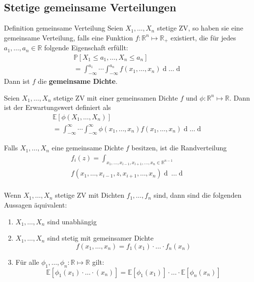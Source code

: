 \documentclass[a4paper,10pt]{article}
\def\R{\mathbb{R}}
\def\P{\mathbb{P}}
\def\E{\mathbb{E}}
\begin{document}
\subsection{Stetige gemeinsame Verteilungen}
\begin{subbox}{Definition gemeinsame Verteilung}
	Seien \(X_1, \ldots, X_n\) stetige ZV, so haben sie eine gemeinsame Verteilung, falls eine Funktion \(f: \R^n \mapsto \R_+\) existiert, die für jedes \(a_1, \ldots, a_n \in \R\) folgende Eigenschaft erfüllt:
	\begin{align*}
		\P[X_1 \le a_1, \ldots, X_n \le a_n] \\= \int_{-\infty}^{a_1} \cdots \int_{-\infty}^{a_n} f(x_1, \ldots, x_n) \mathop{dx_n} \ldots \mathop{dx_1}
	\end{align*}
	Dann ist \(f\) die \textbf{gemeinsame Dichte}.
\end{subbox}

Seien \(X_1, \ldots, X_n\) stetige ZV mit einer gemeinsamen Dichte \(f\) und \(\phi: \R^n \mapsto \R\). Dann ist der Erwartungswert definiert als
\begin{align*}
	\E[\phi(X_1, \ldots, X_n)] \\= \int_{-\infty}^\infty \cdots \int_{-\infty}^\infty \phi(x_1, \ldots, x_n) f(x_1, \ldots, x_n) \mathop{dx_n} \ldots \mathop{dx_1}
\end{align*}

Falls \(X_1, \ldots, X_n\) eine gemeinsame Dichte \(f\) besitzen, ist die Randverteilung 
\begin{align*}
	f_i(z) = \int_{x_1, \ldots, x_{i-1}, x_{i+1}, \ldots, x_n \in \R^{n-1}}\\
	f(x_1, \ldots, x_{i-1}, z, x_{i+1}, \ldots, x_n) \mathop{dx_n} \ \ldots \mathop{dx_1} \\
\end{align*}

Wenn \(X_1, \ldots, X_n\) stetige ZV mit Dichten \(f_1, \ldots, f_n\) sind, dann sind die folgenden Aussagen äquivalent:
\begin{enumerate}
	\item \(X_1, \ldots, X_n\) sind unabhängig
	\item \(X_1, \ldots, X_n\) sind stetig mit gemeinsamer Dichte
		\[f(x_1, \ldots, x_n) = f_1(x_1) \cdot \ldots \cdot f_n(x_n)\]
	\item Für alle \(\phi_1, \ldots, \phi_n: \R \mapsto \R\) gilt:
		\[\E[\phi_1 (x_1)\cdot \ldots\cdot (x_n)] = \E[\phi_1(x_1)] \cdot \ldots \cdot \E[\phi_n(x_n)]\]
\end{enumerate}
\end{document}
